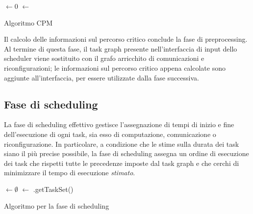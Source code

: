 \IncMargin{1em}
\begin{algorithm}
 
 \BlankLine
  $\leftarrow 0$\;
  $\leftarrow$ \;
 \caption{Algoritmo CPM}
\label{alg:CPM}
\end{algorithm}
\DecMargin{1em}

Il calcolo delle informazioni sul percorso critico conclude la fase di 
preprocessing. Al termine di questa fase, il task graph presente 
nell'interfaccia di input dello scheduler viene sostituito con il grafo 
arricchito di comunicazioni e riconfigurazioni; le informazioni sul percorso 
critico appena calcolate sono aggiunte all'interfaccia, per essere utilizzate 
dalla fase successiva.


\subsection{Fase di scheduling}
\label{subsec:faseScheduling}
La fase di scheduling effettivo gestisce l'assegnazione di tempi di inizio e 
fine dell'esecuzione di ogni task, sia esso di computazione, comunicazione o 
riconfigurazione. In particolare, a condizione che le stime sulla durata dei 
task siano il più precise possibile, la fase di scheduling assegna un ordine di 
esecuzione dei task che rispetti tutte le precedenze imposte dal task graph e 
che cerchi di minimizzare il tempo di esecuzione \emph{stimato}.

\IncMargin{1em}
\begin{algorithm}
 
 \BlankLine
 \SchedulerOutput $\leftarrow \emptyset$\;
 \UnscheduledSet $\leftarrow$ \SchedulerInput.getTaskSet()\;
 \Return{\SchedulerOutput}
\caption{Algoritmo per la fase di scheduling}
\label{alg:faseScheduling}
\end{algorithm}
\DecMargin{1em}

